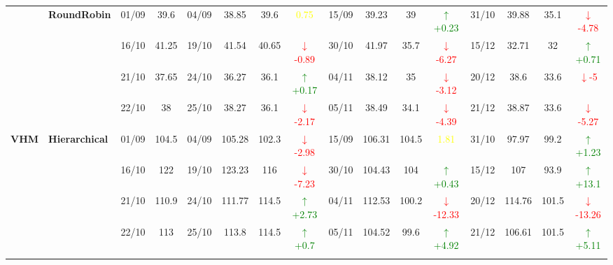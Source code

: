 \documentclass{ieeeaccess}
\begin{document}
{\begin{longtable}{llcc|cccc|cccc|cccc}
& \textbf{RoundRobin}
& 01/09 & 39.6 & 04/09 & 38.85 & 39.6 & \textcolor{yellow}{0.75} & 15/09 & 39.23 & 39 & \textcolor{green}{\(\uparrow\)+0.23} & 31/10 & 39.88 & 35.1 & \textcolor{red}{\(\downarrow\)-4.78} \\

&
& 16/10 & 41.25 & 19/10 & 41.54 & 40.65 & \textcolor{red}{\(\downarrow\)-0.89} & 30/10 & 41.97 & 35.7 & \textcolor{red}{\(\downarrow\)-6.27} & 15/12 & 32.71 & 32 & \textcolor{green}{\(\uparrow\)+0.71} \\

&
& 21/10 & 37.65 & 24/10 & 36.27 & 36.1 & \textcolor{green}{\(\uparrow\)+0.17} & 04/11 & 38.12 & 35 & \textcolor{red}{\(\downarrow\)-3.12} & 20/12 & 38.6 & 33.6 &\textcolor{red}{\(\downarrow\)-5}\\

&
& 22/10 & 38 & 25/10 & 38.27 & 36.1 & \textcolor{red}{\(\downarrow\)-2.17} & 05/11 & 38.49 & 34.1 & \textcolor{red}{\(\downarrow\)-4.39} & 21/12 & 38.87 & 33.6 & \textcolor{red}{\(\downarrow\)-5.27} \\
\midrule




\multirow{12}{*}{\textbf{VHM}} 
& \textbf{Hierarchical}
& 01/09 & 104.5 & 04/09 & 105.28 & 102.3 & \textcolor{red}{\(\downarrow\)-2.98} & 15/09 & 106.31 & 104.5 & \textcolor{yellow}{1.81} & 31/10 & 97.97 & 99.2 & \textcolor{green}{\(\uparrow\)+1.23} \\

&
& 16/10 & 122 & 19/10 & 123.23 & 116 & \textcolor{red}{\(\downarrow\)-7.23} & 30/10 & 104.43 & 104 & \textcolor{green}{\(\uparrow\)+0.43} & 15/12 & 107 & 93.9 & \textcolor{green}{\(\uparrow\)+13.1} \\

&
& 21/10 & 110.9 & 24/10 & 111.77 & 114.5 & \textcolor{green}{\(\uparrow\)+2.73} & 04/11 & 112.53 & 100.2 & \textcolor{red}{\(\downarrow\)-12.33} & 20/12 & 114.76 & 101.5 & \textcolor{red}{\(\downarrow\)-13.26} \\

&
& 22/10 & 113 & 25/10 & 113.8 & 114.5 & \textcolor{green}{\(\uparrow\)+0.7} & 05/11 & 104.52 & 99.6 & \textcolor{green}{\(\uparrow\)+4.92} & 21/12 & 106.61 & 101.5 & \textcolor{green}{\(\uparrow\)+5.11} \\
\cmidrule(lr){2-16}



\end{longtable}}
\end{document}

